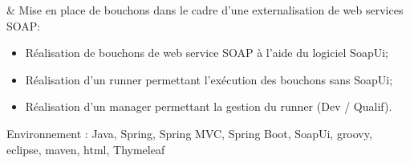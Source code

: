 
& Mise en place de bouchons dans le cadre d'une externalisation de web services SOAP:%
			   \begin{itemize}%
			   		\item Réalisation de bouchons de web service SOAP à l'aide du logiciel SoapUi;%
			   		\item Réalisation d'un runner permettant l'exécution des bouchons sans SoapUi;%
			   		\item Réalisation d'un manager permettant la gestion du runner (Dev / Qualif).
			   \end{itemize}%
Environnement : Java, Spring, Spring MVC, Spring Boot, SoapUi, groovy, eclipse, maven, html, Thymeleaf \\\\
